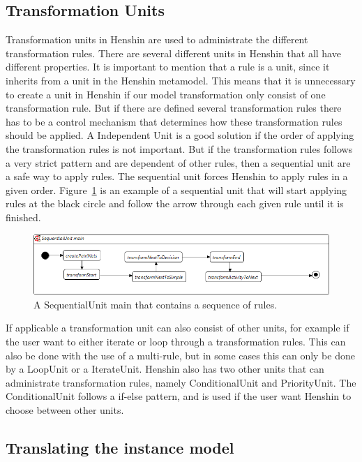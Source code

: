 \documentclass[pdftex,11pt,a4paper]{article}
\begin{document}
\subsection{Transformation Units}
Transformation units in Henshin are used to administrate the different
transformation rules. There are several different units in Henshin that all have
different properties. It is important to mention that a rule is a unit,
since it inherits from a unit in the Henshin metamodel. This means that it is
unnecessary to create a unit in Henshin if our model transformation only
consist of one transformation rule. But if there are defined several
transformation rules there has to be a control mechanism that determines how
these transformation rules should be applied. A Independent Unit is a good
solution if the order of applying the transformation rules is not important.
But if the transformation rules follows a very strict pattern and are dependent
of other rules, then a sequential unit are a safe way to apply rules. The
sequential unit forces Henshin to apply rules in a given order.
Figure~\ref{fig:SequentialUnitHenshin} is an example of a sequential unit
that will start applying rules at the black circle and follow the arrow
through each given rule until it is finished.  

\begin{figure}[H]
	\centering
	\includegraphics[scale=0.5]{figures/SequentialUnitHenshin.png}
	\caption{A SequentialUnit main that contains a sequence of rules.}
	\label{fig:SequentialUnitHenshin}
\end{figure}

If applicable a transformation unit can also consist of other units, for example
if the user want to either iterate or loop through a transformation rules. This
can also be done with the use of a multi-rule, but in some cases this can only
be done by a LoopUnit or a IterateUnit. Henshin also has two other units that
can administrate transformation rules, namely ConditionalUnit and PriorityUnit.
The ConditionalUnit follows a if-else pattern, and is used if the user want
Henshin to choose between other units. 

\subsection{Translating the instance model}
\end{document}
